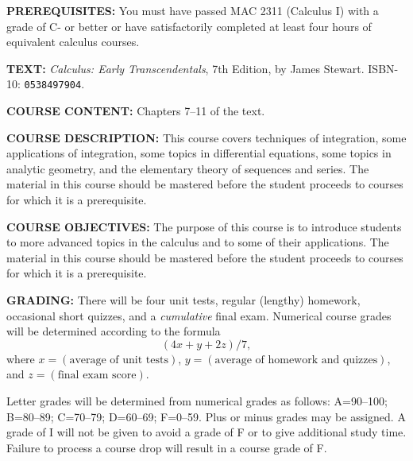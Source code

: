 \documentclass[12pt,oneside]{amsart}
\begin{document}
\noindent \textbf{PREREQUISITES:} You must have passed MAC 2311 (Calculus I)  with a grade of C- or better or have satisfactorily completed at least four hours of
equivalent calculus courses.

\noindent \textbf{TEXT:} \textit{Calculus: Early Transcendentals}, 7th Edition, by
James Stewart. ISBN-10: \texttt{0538497904}.

\noindent \textbf{COURSE CONTENT:} Chapters 7--11 of the text.

\noindent \textbf{COURSE DESCRIPTION:} This course covers techniques of integration, some applications of integration, some topics in differential equations, some topics in analytic geometry, and the elementary theory of sequences and series. The
material in this course should be mastered before the student proceeds to courses for which it is a prerequisite.

\noindent \textbf{COURSE OBJECTIVES:} The purpose of this course is to introduce students to more advanced topics in the calculus and to some of their applications. The material in this course should be mastered before the student proceeds to
courses for which it is a prerequisite.

\noindent \textbf{GRADING:} There will be four unit tests, regular (lengthy) homework, occasional short quizzes, and a \textit{cumulative} final exam. Numerical course grades will be determined according to the formula\vspace{-1mm}
$$(4x+y+2z)/7,$$ \vspace{-3mm}
where $x=(\text{average of unit tests})$, $y=(\text{average of homework and quizzes})$, and $z=(\text{final exam score})$.

Letter grades will be determined from numerical grades as follows: A=90--100; B=80--89; C=70--79; D=60--69; F=0--59. Plus or minus grades may be assigned. A grade of I will not be given to avoid a grade of F or to give additional study time. Failure to process a course drop will result in a course grade of F.

\end{document}
